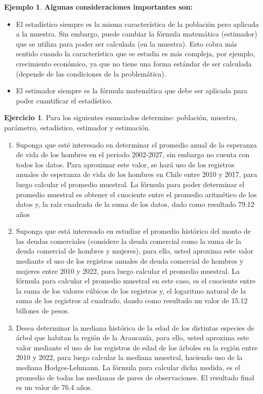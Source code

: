 \documentclass[
  11pt,
]{book}
\providecommand{\tightlist}{%
  \setlength{\itemsep}{0pt}\setlength{\parskip}{0pt}}
\theoremstyle{definition}
\theoremstyle{definition}
\newtheorem{example}{Ejemplo}[chapter]
\theoremstyle{definition}
\newtheorem{exercise}{Ejercicio}[chapter]
\theoremstyle{definition}
\theoremstyle{remark}
\begin{document}
\begin{enumerate}
\begin{example}
  \textbf{Algunas consideraciones importantes son:}

  \begin{itemize}
  \tightlist
  \item
    El estadístico siempre es la misma característica de la población pero aplicada a la muestra. Sin embargo, puede cambiar la fórmula matemática (estimador) que se utiliza para poder ser calculada (en la muestra). Esto cobra más sentido cuando la característica que se estudia es más compleja, por ejemplo, crecimiento económico, ya que no tiene una forma estándar de ser calculada (depende de las condiciones de la problemática).
  \item
    El estimador siempre es la fórmula matemática que debe ser aplicada para poder cuantificar el estadístico.
  \end{itemize}

  \end{example}

  \begin{exercise}

  Para los siguientes enunciados determine: población, muestra, parámetro, estadístico, estimador y estimación.

  \begin{enumerate}
  \def\labelenumii{\arabic{enumii}.}
  \item
    Suponga que esté interesado en determinar el promedio anual de la esperanza de vida de los hombres en el periodo 2002-2027, sin embargo no cuenta con todos los datos. Para aproximar este valor, se hará uso de los registros anuales de esperanza de vida de los hombres en Chile entre 2010 y 2017, para luego calcular el promedio muestral. La fórmula para poder determinar el promedio muestral es obtener el cuociente entre el promedio aritmético de los datos y, la raíz cuadrada de la suma de los datos, dado como resultado 79.12 años
  \item
    Suponga que está interesado en estudiar el promedio histórico del monto de las deudas comerciales (considere la deuda comercial como la suma de la deuda comercial de hombres y mujeres), para ello, usted aproxima este valor mediante el uso de los registros anuales de deuda comercial de hombres y mujeres entre 2010 y 2022, para luego calcular el promedio muestral. La fórmula para calcular el promedio muestral en este caso, es el cuociente entre la suma de los valores cúbicos de los registros y, el logaritmo natural de la suma de los registros al cuadrado, dando como resultado un valor de 15.12 billones de pesos.
  \item
    Desea determinar la mediana histórica de la edad de los distintas especies de árbol que habitan la región de la Araucanía, para ello, usted aproxima este valor mediante el uso de los registros de edad de los árboles en la región entre 2010 y 2022, para luego calcular la mediana muestral, haciendo uso de la mediana Hodges-Lehmann. La fórmula para calcular dicha medida, es el promedio de todas las medianas de pares de observaciones. El resultado final es un valor de 76.4 años.
  \end{enumerate}


\end{exercise}
\end{enumerate}
\end{document}
